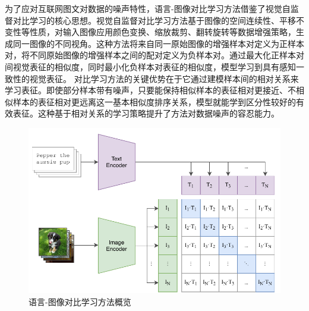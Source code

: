 为了应对互联网图文对数据的噪声特性，语言-图像对比学习方法\cite{radford2021learning}借鉴了视觉自监督对比学习的核心思想。视觉自监督对比学习方法\cite{chen2020simple}基于图像的空间连续性、平移不变性等性质，对输入图像应用颜色变换、缩放裁剪、翻转旋转等数据增强策略，生成同一图像的不同视角。这种方法将来自同一原始图像的增强样本对定义为正样本对，将不同原始图像的增强样本之间的配对定义为负样本对。通过最大化正样本对间视觉表征的相似度，同时最小化负样本对表征的相似度，模型学习到具有感知一致性的视觉表征。
对比学习方法的关键优势在于它通过建模样本间的相对关系来学习表征。即使部分样本带有噪声，只要能保持相似样本的表征相对更接近、不相似样本的表征相对更远离这一基本相似度排序关系，模型就能学到区分性较好的有效表征。这种基于相对关系的学习策略提升了方法对数据噪声的容忍能力。

\begin{figure}
  \centering
  \includegraphics[width=0.9\linewidth]{figures/论文-图6-CLIP-方法.pdf}
  \caption{语言-图像对比学习方法\cite{radford2021learning}概览}
  \label{fig:6-CLIP-Method}
\end{figure}

